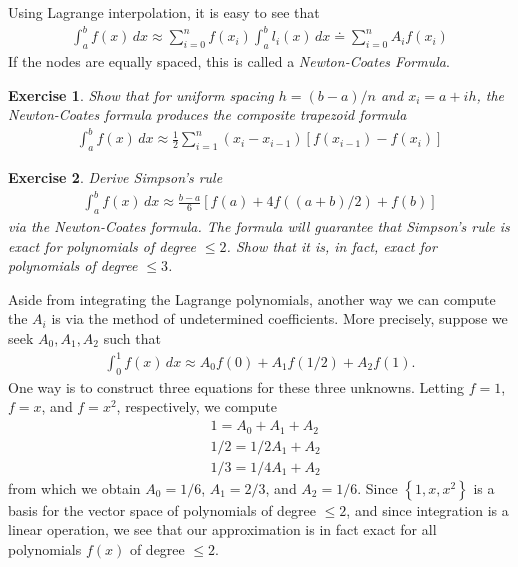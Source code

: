 \documentclass[12pt,reqno]{amsart}
\numberwithin{equation}{section}  %
\newtheorem*{exercise}{Exercise}
\begin{document}
Using Lagrange interpolation, it is easy to see that
\begin{align*}
\int_a^b f(x)\, dx \approx \sum_{i=0}^n f(x_i)\int_a^b l_i(x)\, dx 
\doteq \sum_{i=0}^n A_i f(x_i)
\end{align*}
If the nodes are equally spaced, this is called a \emph{Newton-Coates Formula}.
\begin{exercise}
Show that for uniform spacing $h = (b-a)/n$ and $x_i = a + ih$,
the Newton-Coates formula produces the composite trapezoid formula
\begin{align*}
\int_a^b f(x) \, dx \approx \frac{1}{2}\sum_{i=1}^n
(x_i - x_{i-1})[f(x_{i-1}) - f(x_i)]
\end{align*}
\end{exercise}
\begin{exercise}
Derive Simpson's rule
\begin{align*}
\int_a^b f(x)\, dx \approx \frac{b-a}{6} \left [f(a) + 4f((a+b)/2) + f(b) \right]	
\end{align*}
via the Newton-Coates formula. The formula will guarantee that
Simpson's rule is exact for polynomials of degree $\le 2$. Show that it is,
in fact, exact for polynomials of degree $\le 3$.
\end{exercise}
Aside from integrating the Lagrange polynomials, another way we can
compute the $A_i$ is via the method of undetermined coefficients. More precisely,
suppose we seek $A_0, A_1, A_2$ such that
\begin{align*}
\int_0^1 f(x) \, dx \approx A_0 f(0) + A_1 f(1/2) + A_2 f(1).
\end{align*}
One way is to construct three equations for these three unknowns.
Letting $f = 1$, $f = x$, and $f = x^2$, respectively, we compute
\begin{align*}
& 1 = A_0 + A_1 + A_2
\\
& 1/2 = 1/2A_1 + A_2
\\
& 1/3 = 1/4A_1 + A_2
\end{align*}
from which we obtain $A_0 = 1/6$, $A_1 = 2/3$, and $A_2 = 1/6$.
Since $ \left\{ 1, x, x^2 \right\} $ is a basis for the vector space of 
polynomials of degree $\le 2$, and since integration is a linear operation, we see that our approximation is in fact exact
for all polynomials $f(x)$ of degree $\le 2$.
\end{document}
